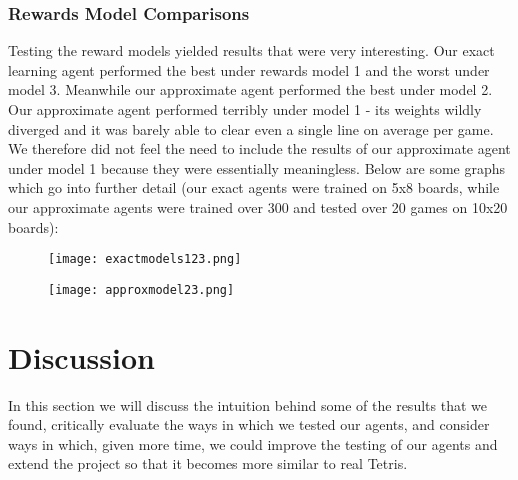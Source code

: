 \documentclass[11pt]{article}
\begin{document}
\subsubsection{Rewards Model Comparisons}
Testing the reward models yielded results that were very interesting. Our exact learning agent performed the best under rewards model 1 and the worst under model 3. Meanwhile our approximate agent performed the best under model 2. Our approximate agent performed terribly under model 1 - its weights wildly diverged and it was barely able to clear even a single line on average per game. We therefore did not feel the need to include the results of our approximate agent under model 1 because they were essentially meaningless. Below are some graphs which go into further detail (our exact agents were trained on 5x8 boards, while our approximate agents were trained over 300 and tested over 20 games on 10x20 boards):
\begin{figure}[H]
  \centering
  \begin{minipage}[b]{0.4\textwidth}
    \texttt{[image: exactmodels123.png]}
  \end{minipage}
  \hfill
  \begin{minipage}[b]{0.4\textwidth}
    \texttt{[image: approxmodel23.png]}
  \end{minipage}
\end{figure}

\section{Discussion}
In this section we will discuss the intuition behind some of the results that we found, critically evaluate the ways in which we tested our agents, and consider ways in which, given more time, we could improve the testing of our agents and extend the project so that it becomes more similar to real Tetris.

\bigskip
\end{document}
